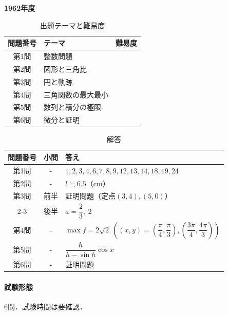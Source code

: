 \documentclass[../../main.tex]{subfiles}
\begin{document}
\begin{center}
  {\fontsize{48pt}{58pt}\selectfont \textbf{1962}\normalsize\textbf{年度}}
\end{center}

\begin{table}[htb]
  \centering
  \caption{出題テーマと難易度}
  \begin{tabular}{|c|p{9cm}|c|}
    \hline
    \textbf{問題番号} & \textbf{テーマ} & \textbf{難易度} \\
    \hline
    第1問 & 整数問題 & \\
    \hline
    第2問 & 図形と三角比 & \\
    \hline
    第3問 & 円と軌跡 & \\
    \hline
    第4問 & 三角関数の最大最小 & \\
    \hline
    第5問 & 数列と積分の極限 & \\
    \hline
    第6問 & 微分と証明 & \\
    \hline
  \end{tabular}
\end{table}

\begin{table}[htb]
  \centering
  \caption{解答}
  \renewcommand{\arraystretch}{1.4}
  \begin{tabular}{|c|c|p{9cm}|}
    \hline
    \textbf{問題番号} & \textbf{小問} & \textbf{答え} \\
    \hline
    第1問 & - & $1,2,3,4,6,7,8,9,12,13,14,18,19,24$ \\
    \hline
    第2問 & - & $l \fallingdotseq 6.5$（cm） \\
    \hline
    第3問 & 前半 & 証明問題（定点$(3,4),(5,0)$） \\
    \cline{2-3}
    & 後半 & $a=\dfrac{2}{3},\ 2$ \\
    \hline
    第4問 & - & $\max f=2\sqrt{2}\ \left((x,y)=\left(\dfrac{\pi}{4},\dfrac{\pi}{3}\right),\left(\dfrac{3\pi}{4},\dfrac{4\pi}{3}\right)\right)$ \\
    \hline
    第5問 & - & $\dfrac{h}{h-\sin h}\cos x$ \\
    \hline
    第6問 & - & 証明問題 \\
    \hline
  \end{tabular}
\end{table}

\paragraph{試験形態}
6問．試験時間は要確認．
\end{document}
